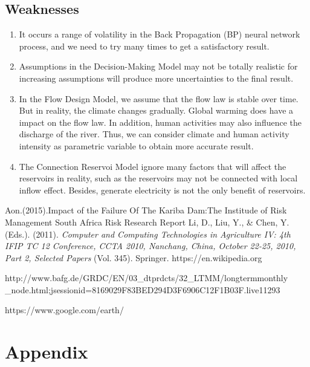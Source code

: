 \documentclass[12pt]{article}%
\begin{document}
\subsection{Weaknesses}
		\begin{enumerate}[1.]
		\item It occurs a range of volatility in the Back Propagation (BP) neural network process, and we need to try many times to get a satisfactory result.
		\item Assumptions in the Decision-Making Model may not be totally realistic for increasing assumptions will produce more uncertainties to the final result.
		\item In the Flow Design Model, we assume that the flow law is stable over time. But in reality, the climate changes gradually. Global warming does have a impact on the flow law. In addition, human activities may also influence the discharge of the river. Thus, we can consider climate and human activity intensity as parametric variable to obtain more accurate result.
		\item The Connection Reservoi Model ignore many factors that will affect the reservoirs in reality, such as the reservoirs may not be connected with local inflow effect. Besides, generate electricity is not the only benefit of reservoirs.  
		\end{enumerate} 
\newpage
\pagestyle{empty} %
\begin{thebibliography}{0}
\thispagestyle{empty}
Aon.(2015).Impact of the Failure Of The Kariba Dam:The Institude of Risk Management South Africa Risk Research Report 
Li, D., Liu, Y., \& Chen, Y. (Eds.). (2011). \emph{Computer and Computing Technologies in Agriculture IV: 4th IFIP TC 12 Conference, CCTA 2010, Nanchang, China, October 22-25, 2010, Part 2, Selected Papers} (Vol. 345). Springer.
https://en.wikipedia.org


http://www.bafg.de/GRDC/EN/03\_dtprdcts/32\_LTMM/longtermmonthly
\_node.html;jsessionid=8169029F83BED294D3F6906C12F1B03F.live11293

https://www.google.com/earth/

\end{thebibliography}
\newpage
\section{Appendix}
\thispagestyle{empty}
\end{document}
